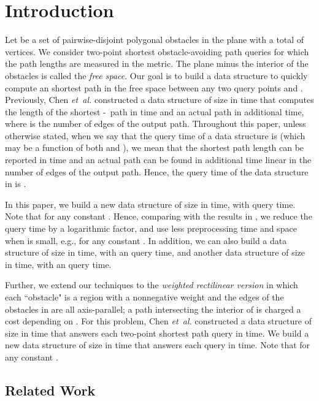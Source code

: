 \documentclass[english,runningheads,11pt]{llncs}
\def\etal{\textsl{et~al. }}
\def\st{-}
\begin{document}
\section{Introduction}
\label{sec:intro}
Let  be a set of  pairwise-disjoint polygonal obstacles in the
plane with a total of  vertices. We consider two-point shortest obstacle-avoiding
path queries for which the path lengths are measured in the  metric.
The plane minus the interior of
the obstacles is called the {\em free space}. Our goal is to build a
data structure to quickly compute an  shortest path
in the free space between any two query points  and .
Previously, Chen \etal \cite{ref:ChenSh00} constructed a data structure of
size  in  time that computes the
length of the  shortest \st\ path in  time and an
actual path in additional  time,
where  is the number of edges of the output path. Throughout this paper,
unless otherwise stated,
when we say that the query time of a data structure is  (which
may be a function of both  and ), we
mean that the shortest path length can be reported in
 time and an actual path can be found in additional time
linear in the number of edges of the output path. Hence, the query
time of the data structure in \cite{ref:ChenSh00} is .

In this paper, we build a new data structure of size
 in
 time, with 
query time.  Note that  for any constant . Hence, comparing with
the results in \cite{ref:ChenSh00}, we reduce the query
time by a logarithmic factor, and use less preprocessing time and
space when  is small, e.g.,  for any constant .
In addition, we can also build a data structure of size 
in  time, with an  query time,
and another data structure of size 
in  time, with an  query
time.

Further, we extend our techniques to the {\em weighted rectilinear
version} in which each ``obstacle"  is a region with a nonnegative
weight  and the edges of the obstacles in  are all axis-parallel;
a path intersecting the interior of  is charged a cost
depending on . For this problem, Chen \etal \cite{ref:ChenSh00}
constructed a data structure of
size  in  time that answers each
two-point shortest path query in  time.
We build a new data structure of size  in  time that answers each query in  time.
Note that  for any constant .


\subsection{Related Work}
\end{document}
